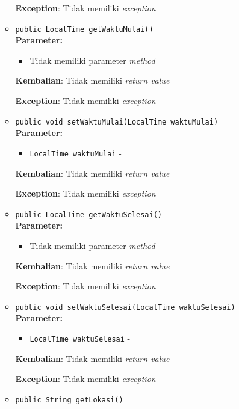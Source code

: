 \documentclass{article}
\begin{document}
\begin{enumerate}
\begin{itemize}
\textbf{Exception}: Tidak memiliki \textit{exception}

\item \texttt{public LocalTime getWaktuMulai()}\\ 


\textbf{Parameter:}\begin{itemize}
\item Tidak memiliki parameter \textit{method}
\end{itemize}
\textbf{Kembalian}: Tidak memiliki \textit{return value}

\textbf{Exception}: Tidak memiliki \textit{exception}

\item \texttt{public void setWaktuMulai(LocalTime waktuMulai)}\\ 


\textbf{Parameter:}\begin{itemize}
\item \texttt{LocalTime waktuMulai} - 
\end{itemize}
\textbf{Kembalian}: Tidak memiliki \textit{return value}

\textbf{Exception}: Tidak memiliki \textit{exception}

\item \texttt{public LocalTime getWaktuSelesai()}\\ 


\textbf{Parameter:}\begin{itemize}
\item Tidak memiliki parameter \textit{method}
\end{itemize}
\textbf{Kembalian}: Tidak memiliki \textit{return value}

\textbf{Exception}: Tidak memiliki \textit{exception}

\item \texttt{public void setWaktuSelesai(LocalTime waktuSelesai)}\\ 


\textbf{Parameter:}\begin{itemize}
\item \texttt{LocalTime waktuSelesai} - 
\end{itemize}
\textbf{Kembalian}: Tidak memiliki \textit{return value}

\textbf{Exception}: Tidak memiliki \textit{exception}

\item \texttt{public String getLokasi()}\\ 



\end{itemize}
\end{enumerate}
\end{document}
